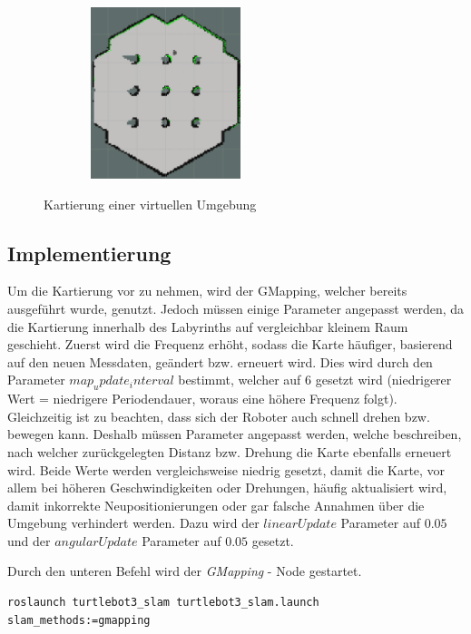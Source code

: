 {{\begin{figure}[H]
			\qquad %
			\begin{subfigure}[h]{.33\linewidth}
				\centering
				\includegraphics[scale=0.6, height =5cm, width=5cm]{Bilder/mapping_smpl_4.png}
				\label{pic:mapping_smpl_4}
			\end{subfigure}%
			\caption{Kartierung einer virtuellen Umgebung}
			\label{pic:mapping_smpl}
		\end{figure}
	}
	\subsection{Implementierung}
	{
		Um die Kartierung vor zu nehmen, wird der GMapping, welcher bereits ausgeführt wurde, genutzt. Jedoch müssen einige Parameter angepasst werden, da die Kartierung innerhalb des Labyrinths auf vergleichbar kleinem Raum geschieht. Zuerst wird die Frequenz erhöht, sodass die Karte häufiger, basierend auf den neuen Messdaten, geändert bzw. erneuert wird. Dies wird durch den Parameter $map_update_interval$ bestimmt, welcher auf $6$ gesetzt wird (niedrigerer Wert = niedrigere Periodendauer, woraus eine höhere Frequenz folgt). Gleichzeitig ist zu beachten, dass sich der Roboter auch schnell drehen bzw. bewegen kann. Deshalb müssen Parameter angepasst werden, welche beschreiben, nach welcher zurückgelegten Distanz bzw. Drehung die Karte ebenfalls erneuert wird. Beide Werte werden vergleichsweise niedrig gesetzt, damit die Karte, vor allem bei höheren Geschwindigkeiten oder Drehungen, häufig aktualisiert wird, damit inkorrekte Neupositionierungen oder gar falsche Annahmen über die Umgebung verhindert werden. Dazu wird der $linearUpdate$ Parameter auf $0.05$ und der $angularUpdate$ Parameter auf $0.05$ gesetzt.
		
		Durch den unteren Befehl wird der \emph{GMapping} - Node gestartet.
		\begin{lstlisting}
roslaunch turtlebot3_slam turtlebot3_slam.launch slam_methods:=gmapping
		\end{lstlisting}

}}
